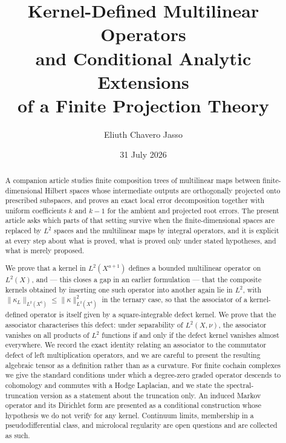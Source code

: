 \documentclass[11pt]{amsart}
\title[Kernel-defined multilinear operators]{Kernel-Defined Multilinear Operators\\ and Conditional Analytic Extensions\\ of a Finite Projection Theory}
\author{Eliuth Chavero Jasso}
\date{31 July 2026}
\theoremstyle{definition}
\theoremstyle{remark}
\newcommand{\norm}[1]{\lVert#1\rVert}
\begin{document}
\maketitle

\begin{abstract}
A companion article \cite{ChaveroJassoTrees} studies finite composition trees of
multilinear maps between finite-dimensional Hilbert spaces whose intermediate outputs are
orthogonally projected onto prescribed subspaces, and proves an exact local error
decomposition together with uniform coefficients $k$ and $k-1$ for the ambient and
projected root errors. The present article asks which parts of that setting survive when
the finite-dimensional spaces are replaced by $L^2$ spaces and the multilinear maps by
integral operators, and it is explicit at every step about what is proved, what is proved
only under stated hypotheses, and what is merely proposed.

We prove that a kernel in $L^2(X^{a+1})$ defines a bounded multilinear operator on
$L^2(X)$, and --- this closes a gap in an earlier formulation --- that the composite
kernels obtained by inserting one such operator into another again lie in $L^2$, with
$\norm{\kappa_L}_{L^2(X^{6})}\le\norm{\kappa}_{L^2(X^{4})}^{2}$ in the ternary case, so
that the associator of a kernel-defined operator is itself given by a square-integrable
defect kernel. We prove that the associator characterises this defect: under separability
of $L^2(X,\nu)$, the associator vanishes on all products of $L^2$ functions if and only if
the defect kernel vanishes almost everywhere. We record the exact identity relating an
associator to the commutator defect of left multiplication operators, and we are careful
to present the resulting algebraic tensor as a definition rather than as a curvature.
For finite cochain complexes we give the standard conditions under which a degree-zero
graded operator descends to cohomology and commutes with a Hodge Laplacian, and we state
the spectral-truncation version as a statement about the truncation only. An induced
Markov operator and its Dirichlet form are presented as a conditional construction whose
hypothesis we do not verify for any kernel. Continuum limits, membership in a
pseudodifferential class, and microlocal regularity are open questions and are collected
as such.
\end{abstract}

\end{document}

